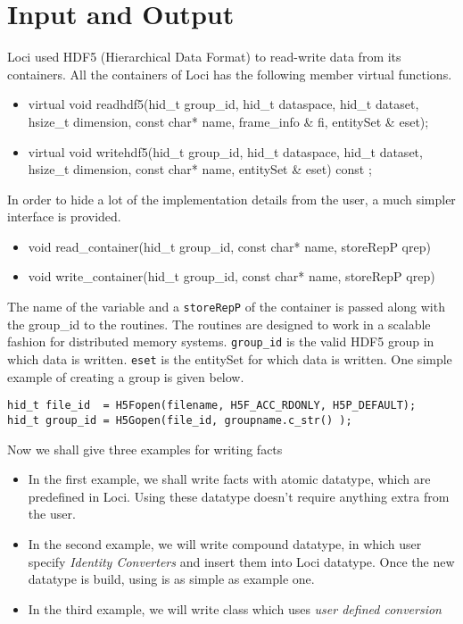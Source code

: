 \chapter{Input and Output}
Loci used HDF5 (Hierarchical Data Format)  to read-write data from its 
containers. All the containers of Loci has the following member
virtual functions. 
%
\begin{itemize} 
\item virtual void readhdf5(hid\_t group\_id, hid\_t dataspace, hid\_t
  dataset, hsize\_t dimension, const char* name, frame\_info \& fi,
  entitySet \&  eset); 
\item virtual void writehdf5(hid\_t group\_id, hid\_t dataspace,
  hid\_t dataset, hsize\_t dimension, const char* name, entitySet \&
  eset) const ; 
\end{itemize}

%
In order to hide a lot of the implementation details from the user, a
much simpler interface is provided.
\begin{itemize} 
\item void read\_container(hid\_t group\_id, const char* name,  storeRepP qrep)
\item void write\_container(hid\_t group\_id, const char* name,  storeRepP qrep)
\end{itemize}

%
The name of the variable and a {\tt storeRepP} of the container is
passed along with the group\_id to the routines. The routines are
designed to work in a scalable fashion for distributed memory systems. 
{\tt group\_id} is the valid HDF5 group in which data is written. {\tt eset} is
the entitySet for which data is written. One simple example of
creating a group is given below. 
%
\begin{verbatim} 
hid_t file_id  = H5Fopen(filename, H5F_ACC_RDONLY, H5P_DEFAULT);
hid_t group_id = H5Gopen(file_id, groupname.c_str() );
\end{verbatim} 

%
\par Now we shall give three examples for writing facts
\begin{itemize}
\item  In the first example, we shall write facts with atomic datatype, which
are predefined in Loci. Using these datatype doesn't require anything extra 
from the user.
\item In the second example, we will write compound datatype, in which user
specify {\em Identity Converters} and insert them into Loci datatype. Once the
new datatype is build, using is as simple as example one.
\item In the third example, we will write class which uses {\em user
    defined conversion} 
\end{itemize}
